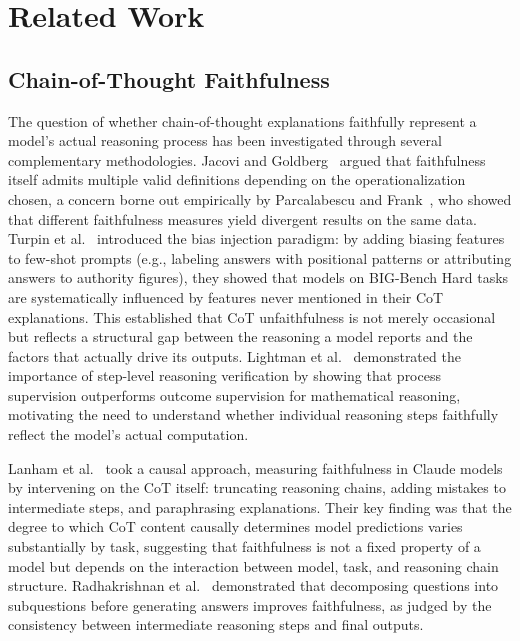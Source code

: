 
\section{Related Work}

\subsection{Chain-of-Thought Faithfulness}

The question of whether chain-of-thought explanations faithfully represent a model's
actual reasoning process has been investigated through several complementary
methodologies. Jacovi and Goldberg~\cite{jacovi2020faithfulness} argued that faithfulness itself admits multiple valid definitions depending on the operationalization chosen, a concern borne out empirically by Parcalabescu and Frank~\cite{parcalabescu2023measuring}, who showed that different faithfulness measures yield divergent results on the same data. Turpin et al.~\cite{turpin2023unfaithful} introduced the bias
injection paradigm: by adding biasing features to few-shot prompts (e.g., labeling
answers with positional patterns or attributing answers to authority figures), they
showed that models on BIG-Bench Hard tasks are systematically influenced by features
never mentioned in their CoT explanations. This established that CoT unfaithfulness
is not merely occasional but reflects a structural gap between the reasoning a model
reports and the factors that actually drive its outputs. Lightman et
al.~\cite{lightman2023verify} demonstrated the importance of step-level reasoning
verification by showing that process supervision outperforms outcome supervision
for mathematical reasoning, motivating the need to understand whether individual
reasoning steps faithfully reflect the model's actual computation.

Lanham et al.~\cite{lanham2023measuring} took a causal approach, measuring
faithfulness in Claude models by intervening on the CoT itself: truncating reasoning
chains, adding mistakes to intermediate steps, and paraphrasing explanations. Their
key finding was that the degree to which CoT content causally determines model
predictions varies substantially by task, suggesting that faithfulness is not a fixed
property of a model but depends on the interaction between model, task, and reasoning
chain structure. Radhakrishnan et al.~\cite{radhakrishnan2023decomposition}
demonstrated that decomposing questions into subquestions before generating answers
improves faithfulness, as judged by the consistency between intermediate reasoning
steps and final outputs.

